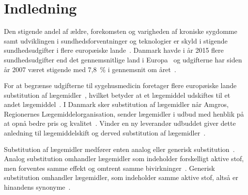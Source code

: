 \chapter{Indledning}
Den stigende andel af ældre, forekomsten og varigheden af kroniske sygdomme samt udviklingen i sundhedsforventninger og teknologier er skyld i stigende sundhedsudgifter i flere europæiske lande~\citep{Ess2003}. Danmark havde i år 2015 flere sundhedsudgifter end det gennemsnitlige land i Europa~\citep{EU2017} og udgifterne har siden år 2007 været stigende med 7,8~\% i gennemsnit om året~\citep{Sundhed2016}.

For at begrænse udgifterne til sygehusmedicin foretager flere europæiske lande substitution af lægemidler~\citep{Ess2003,Johnston2011}, hvilket betyder at et lægemiddel udskiftes til et andet lægemiddel~\citep{DanskSelskabforPatientsikkerhed2009, Kairi2017}.  I Danmark sker substitution af lægemidler når Amgros, Regionernes Lægemiddelorganisation, sender lægemidler i udbud med henblik på at opnå bedre pris og kvalitet~\citep{Amgros2015}. %
Vinder en ny leverandør udbuddet giver dette anledning til lægemiddelskift og derved substitution af lægemidler~\citep{Amgros2015}. %


Substitution af lægemidler medfører enten analog eller generisk substitution~\citep{DanskSelskabforPatientsikkerhed2009}.  
Analog substitution omhandler lægemidler som indeholder forskelligt aktive stof, men forventes samme effekt og omtrent samme bivirkninger~\citep{DanskSelskabforPatientsikkerhed2009,Kairi2017}. 
Generisk substitution omhandler lægemidler, som indeholder samme aktive stof, altså er hinandens synonyme~\citep{DanskSelskabforPatientsikkerhed2009,Kairi2017}. 

